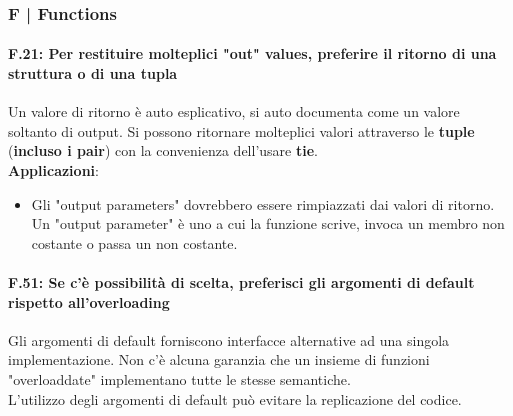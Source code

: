 
\newpage

\subsubsection{F | Functions}

\paragraph{F.21: Per restituire molteplici "out" values, preferire il ritorno di una struttura o di una tupla}

\textsf{\small Un valore di ritorno è auto esplicativo, si auto documenta come un valore soltanto di output. Si possono ritornare molteplici valori attraverso le \textbf{tuple} (\textbf{incluso i pair}) con la convenienza dell'usare \textbf{tie}.} \\

\textsf{\small \textbf{Applicazioni}: }

\begin{itemize}
	\item \textsf{\small Gli "output parameters" dovrebbero essere rimpiazzati dai valori di ritorno. Un "output parameter" è uno a cui la funzione scrive, invoca un membro non costante o passa un non costante. } %
\end{itemize}

\paragraph{F.51: Se c'è possibilità di scelta, preferisci gli argomenti di default rispetto all'overloading}

\textsf{\small Gli argomenti di default forniscono interfacce alternative ad una singola implementazione. Non c'è alcuna garanzia che un insieme di funzioni "overloaddate" implementano tutte le stesse semantiche. } \\

\textsf{\small L'utilizzo degli argomenti di default può evitare la replicazione del codice.} \\


